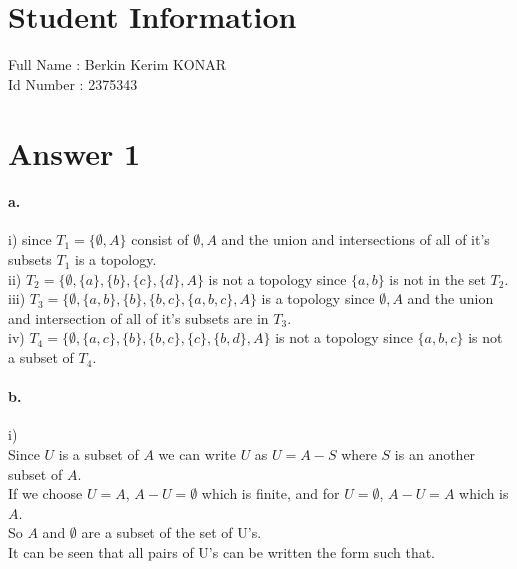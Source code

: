 \documentclass[11pt]{article}
\begin{document}
\section*{Student Information } 
Full Name :  Berkin Kerim KONAR\\
Id Number :  2375343\\

\section*{Answer 1}
\paragraph{a.}
i) since $T_1 = \{ \emptyset, A \} $   consist of $\emptyset, A$ and the union and intersections of all of it's subsets $T_1$ is a topology. \\

ii) $T_2 = \{\emptyset, \{a\}, \{b\}, \{c\}, \{d\}, A\}$ is not a topology since $\{a, b\}$ is not in the set $T_2$. \\

iii) $T_3 = \{\emptyset, \{a, b\}, \{b\}, \{b, c\}, \{a, b, c\}, A\}$ is a topology since $\emptyset, A$ and the union and intersection of all of it's subsets are in $T_3$. \\

iv) $T_4 = \{\emptyset, \{a, c\}, \{b\}, \{b, c\}, \{c\}, \{b, d\}, A\}$ is not a topology since $\{a,b,c \}$ is not a subset of $T_4$.

\paragraph{b.}
i)\\

Since $U$ is a subset of $A$ we can write $U$ as $U = A - S$ where $S$ is an another subset of $A$.\\

If we choose $U = A$, $A-U = \emptyset$ which is finite, and for $U = \emptyset$, $A-U = A$ which is $A$.\\

So $A$ and $\emptyset$ are a subset of the set of U's.\\

It can be seen that all pairs of U's can be written the form such that.\\
\end{document}
